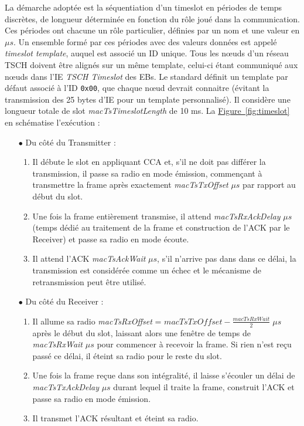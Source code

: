 \documentclass[]{report}
\newcommand{\wordlink}[2]{\hyperref[#2]{#1~\ref{#2}}}
\begin{document}
\par La démarche adoptée est la séquentiation d'un timeslot en périodes de temps discrètes, de longueur déterminée en fonction du rôle joué dans la communication. Ces périodes ont chacune un rôle particulier, définies par un nom et une valeur en $\mu s$. Un ensemble formé par ces périodes avec des valeurs données est appelé \textit{timeslot template}, auquel est associé un ID unique. Tous les nœuds d'un réseau TSCH doivent être alignés sur un même template, celui-ci étant communiqué aux nœuds dans l'IE \textit{TSCH Timeslot} des EBs. Le standard \cite{IEEE802.15.4} définit un template par défaut associé à l'ID \texttt{0x00}, que chaque nœud devrait connaitre (évitant la transmission des 25 bytes d'IE pour un template personnalisé). Il considère une longueur totale de slot \textit{macTsTimeslotLength} de 10 ms. La \wordlink{Figure}{fig:timeslot} en schématise l'exécution :
\vspace{0.2cm}
\begin{itemize}
\item[$\bullet$] Du côté du Transmitter :
\begin{enumerate}
\item Il débute le slot en appliquant CCA et, s'il ne doit pas différer la transmission, il passe sa radio en mode émission, commençant à transmettre la frame après exactement \textit{macTsTxOffset} $\mu s$ par rapport au début du slot.
\vspace{0.1cm}
\item Une fois la frame entièrement transmise, il attend \textit{macTsRxAckDelay} $\mu s$ (temps dédié au traitement de la frame et construction de l'ACK par le Receiver) et passe sa radio en mode écoute.
\vspace{0.1cm}
\item Il attend l'ACK \textit{macTsAckWait} $\mu s$, s'il n'arrive pas dans dans ce délai, la transmission est considérée comme un échec et le mécanisme de retransmission peut être utilisé.
\end{enumerate}
\vspace{0.1cm}
\item[$\bullet$] Du côté du Receiver :
\begin{enumerate}
\item Il allume sa radio \textit{macTsRxOffset} = $macTsTxOffset - \frac{macTsRxWait}{2} \; \mu s$ après le début du slot, laissant alors une fenêtre de temps de \textit{macTsRxWait} $\mu s$ pour commencer à recevoir la frame. Si rien n'est reçu passé ce délai, il éteint sa radio pour le reste du slot.
\vspace{0.1cm}
\item Une fois la frame reçue dans son intégralité, il laisse s'écouler un délai de \textit{macTsTxAckDelay} $\mu s$ durant lequel il traite la frame, construit l'ACK et passe sa radio en mode émission.
\vspace{0.1cm}
\item Il transmet l'ACK résultant et éteint sa radio.
\end{enumerate}
\end{itemize}
	
\end{document}
